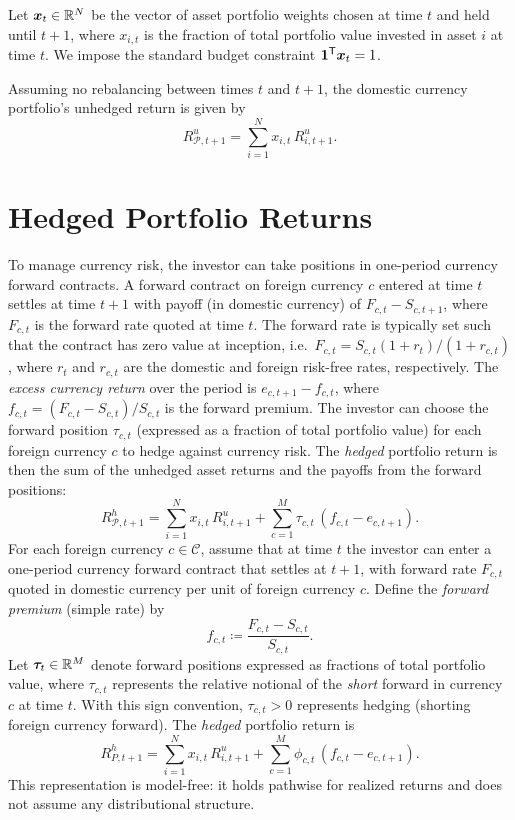 Let $\bm{x}_t\in\mathbb{R}^N$ be the vector of asset portfolio weights chosen at time $t$ and held until $t{+}1$, where $x_{i,t}$ is the fraction of total portfolio value invested in asset $i$ at time $t$. We impose the standard budget constraint $\bm{1}^{\mathsf{T}} \bm{x}_t = 1$.

Assuming no rebalancing between times $t$ and $t{+}1$, the domestic currency portfolio's unhedged return is given by
\begin{equation*}
R^{u}_{\mathcal{P},t+1} = \sum_{i=1}^N x_{i,t}\,R^{u}_{i,t+1}.
\end{equation*}

\section{Hedged Portfolio Returns}

To manage currency risk, the investor can take positions in one-period currency forward contracts. A forward contract on foreign currency $c$ entered at time $t$ settles at time $t{+}1$ with payoff (in domestic currency) of $F_{c,t} - S_{c,t+1}$, where $F_{c,t}$ is the forward rate quoted at time $t$. The forward rate is typically set such that the contract has zero value at inception, i.e.\ $F_{c,t} = S_{c,t}(1+r_t)/(1+r_{c,t})$, where $r_t$ and $r_{c,t}$ are the domestic and foreign risk-free rates, respectively. The \emph{excess currency return} over the period is $e_{c,t+1} - f_{c,t}$, where $f_{c,t} = (F_{c,t} - S_{c,t})/S_{c,t}$ is the forward premium. The investor can choose the forward position $\tau_{c,t}$ (expressed as a fraction of total portfolio value) for each foreign currency $c$ to hedge against currency risk. The \emph{hedged} portfolio return is then the sum of the unhedged asset returns and the payoffs from the forward positions:
\begin{equation*}
R^{h}_{\mathcal{P},t+1} = \sum_{i=1}^N x_{i,t}\,R^{u}_{i,t+1} + \sum_{c=1}^M \tau_{c,t}\,(f_{c,t} - e_{c,t+1}).
\end{equation*}
For each foreign currency $c\in\mathcal{C}$, assume that at time $t$ the investor can enter a one-period currency forward contract that settles at $t{+}1$, with forward rate $F_{c,t}$ quoted in domestic currency per unit of foreign currency $c$. Define the \emph{forward premium} (simple rate) by
\begin{equation*}
f_{c,t} \coloneqq \frac{F_{c,t}-S_{c,t}}{S_{c,t}}.
\end{equation*}
Let $\bm{\tau}_t\in\mathbb{R}^M$ denote forward positions expressed as fractions of total portfolio value, where $\tau_{c,t}$ represents the relative notional of the \emph{short} forward in currency $c$ at time $t$. With this sign convention, $\tau_{c,t}>0$ represents hedging (shorting foreign currency forward). The \emph{hedged} portfolio return is
\begin{equation}
R^{h}_{P,t+1}
=
\sum_{i=1}^N x_{i,t}\,R^{u}_{i,t+1}
+
\sum_{c=1}^M \phi_{c,t}\,(f_{c,t}-e_{c,t+1}).
\label{eq:hedged-portfolio-return}
\end{equation}
This representation is model-free: it holds pathwise for realized returns and does not assume any distributional structure.

